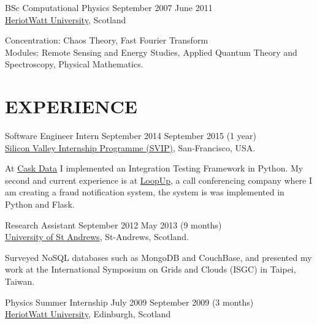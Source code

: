 \documentclass[line,margin]{cv}
\begin{document}
\begin{resume}
BSc Computational Physics
\hfill September 2007 \textemdash{} June 2011 \\
\href{http://www.hw.ac.uk}{Heriot­Watt University}, Scotland

\vspace{0.1em}
\begin{adjustwidth}{2.0em}{2.0em}
	Concentration: Chaos Theory, Fast Fourier Transform \\
  Modules: Remote Sensing and Energy Studies, Applied Quantum Theory and
  Spectroscopy, Physical Mathematics.
\end{adjustwidth}



\section{EXPERIENCE}

Software Engineer Intern
\hfill September 2014 \textemdash{} September 2015 (1 year) \\
\href{http://www.siliconvalleyinternship.com/}
{Silicon Valley Internship Programme (SVIP)}, San-Francisco, USA.

\vspace{0.1em}
\begin{adjustwidth}{2.0em}{2.0em}
  At \href{http://cask.io}{Cask Data} I implemented an Integration Testing
  Framework in Python. My second and current experience is at
  \href{http://loopup.com}{LoopUp}, a call conferencing company where I am
  creating a fraud notification system, the system is was implemented in Python
  and Flask.
\end{adjustwidth}


Research Assistant
\hfill September 2012 \textemdash{}  May 2013 (9 months) \\
\href{http://www.st-andrews.ac.uk}{University of St Andrews}, St-Andrews,
Scotland.

\vspace{0.1em}
\begin{adjustwidth}{2.0em}{2.0em}
    Surveyed NoSQL databases such as MongoDB and CouchBase, and presented
    my work at the International Symposium on Grids and Clouds (ISGC)
    in Taipei, Taiwan.
\end{adjustwidth}


Physics Summer Internship
\hfill July 2009 \textemdash{} September 2009 (3 months) \\
\href{http://www.hw.ac.uk}{Heriot­Watt University}, Edinburgh, Scotland


\end{resume}
\end{document}
